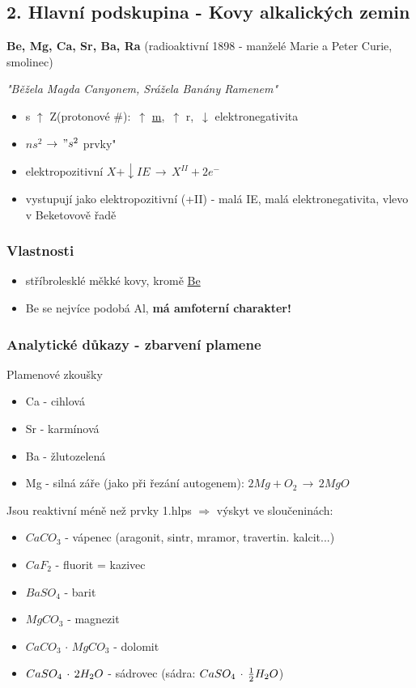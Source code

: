 \newpage
\subsection{2. Hlavní podskupina - Kovy alkalických zemin}
    \textbf{Be, Mg, Ca, Sr, Ba, Ra} (radioaktivní 1898 - manželé Marie a Peter Curie, smolinec)

    \textit{"Běžela Magda Canyonem, Srážela Banány Ramenem"}

    \begin{itemize}
        \item s $\uparrow$ Z(protonové \#): $\,\uparrow$ \underline{m}, $\,\uparrow$ r, $\,\downarrow$ elektronegativita
        \item $ns^2$ \fbox{$\uparrow \downarrow$} $\rightarrow \," s^2$ prvky"
        \item elektropozitivní \(X + \downarrow IE \,\to\,X^{II} + 2e^-\)
        \item vystupují jako elektropozitivní (+II) - malá IE, malá elektronegativita, vlevo v Beketovově řadě
    \end{itemize}

    \subsubsection{Vlastnosti}
        \begin{itemize}
            \item stříbrolesklé měkké kovy, kromě \underline{Be}
            \item Be se nejvíce podobá Al, \textbf{má amfoterní charakter!}
        \end{itemize}

    \subsubsection{Analytické důkazy - zbarvení plamene}
        Plamenové zkoušky
        \begin{itemize}
            \item Ca - cihlová
            \item Sr - karmínová
            \item Ba - žlutozelená
            \item Mg - silná záře (jako při řezání autogenem):  $2Mg + O _2 \,\to\, 2MgO$
        \end{itemize}
    Jsou reaktivní méně než prvky 1.hlps $\Rightarrow$ výskyt ve sloučeninách:
        \begin{itemize}
            \item $CaCO_3$ - vápenec (aragonit, sintr, mramor, travertin. kalcit...)
            \item $CaF_2$ - fluorit = kazivec
            \item $BaSO _4$ - barit
            \item $MgCO_3$ - magnezit
            \item $CaCO_3 \, \cdot \, MgCO_3$ - dolomit
            \item $CaSO_4 \, \cdot \, 2H_2O$ - sádrovec (sádra: $CaSO_4 \,\cdot\, \frac{1}{2}H_2O$)
        \end{itemize}


